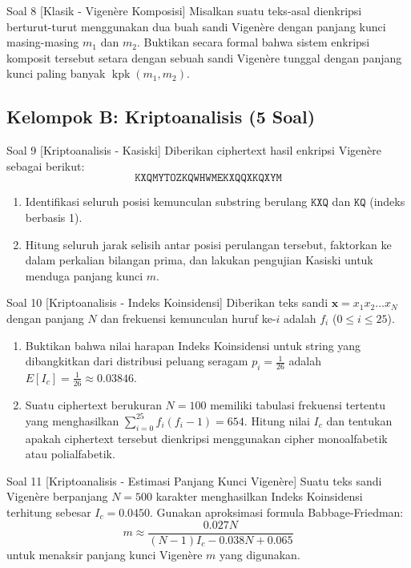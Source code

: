 \documentclass[11pt,a4paper]{article}
\begin{document}
\begin{soalklasik}{Soal 8 [Klasik - Vigenère Komposisi]}
Misalkan suatu teks-asal dienkripsi berturut-turut menggunakan dua buah sandi Vigenère dengan panjang kunci masing-masing $m_1$ dan $m_2$.
Buktikan secara formal bahwa sistem enkripsi komposit tersebut setara dengan sebuah sandi Vigenère tunggal dengan panjang kunci paling banyak $\operatorname{kpk}(m_1, m_2)$.
\end{soalklasik}

\newpage
\subsection{Kelompok B: Kriptoanalisis (5 Soal)}

\begin{soalanalisis}{Soal 9 [Kriptoanalisis - Kasiski]}
Diberikan ciphertext hasil enkripsi Vigenère sebagai berikut:
\[
\texttt{KXQMYTOZKQWHWMEKXQQXKQXYM}
\]
\begin{enumerate}[label=(\alph*)]
    \item Identifikasi seluruh posisi kemunculan substring berulang $\texttt{KXQ}$ dan $\texttt{KQ}$ (indeks berbasis 1).
    \item Hitung seluruh jarak selisih antar posisi perulangan tersebut, faktorkan ke dalam perkalian bilangan prima, dan lakukan pengujian Kasiski untuk menduga panjang kunci $m$.
\end{enumerate}
\end{soalanalisis}

\begin{soalanalisis}{Soal 10 [Kriptoanalisis - Indeks Koinsidensi]}
Diberikan teks sandi $\mathbf{x} = x_1 x_2 \dots x_N$ dengan panjang $N$ dan frekuensi kemunculan huruf ke-$i$ adalah $f_i$ ($0 \le i \le 25$).
\begin{enumerate}[label=(\alph*)]
    \item Buktikan bahwa nilai harapan Indeks Koinsidensi untuk string yang dibangkitkan dari distribusi peluang seragam $p_i = \frac{1}{26}$ adalah $E[I_c] = \frac{1}{26} \approx 0.03846$.
    \item Suatu ciphertext berukuran $N = 100$ memiliki tabulasi frekuensi tertentu yang menghasilkan $\sum_{i=0}^{25} f_i(f_i - 1) = 654$. Hitung nilai $I_c$ dan tentukan apakah ciphertext tersebut dienkripsi menggunakan cipher monoalfabetik atau polialfabetik.
\end{enumerate}
\end{soalanalisis}

\begin{soalanalisis}{Soal 11 [Kriptoanalisis - Estimasi Panjang Kunci Vigenère]}
Suatu teks sandi Vigenère berpanjang $N = 500$ karakter menghasilkan Indeks Koinsidensi terhitung sebesar $I_c = 0.0450$.
Gunakan aproksimasi formula Babbage-Friedman:
\[
m \approx \frac{0.027 N}{(N - 1)I_c - 0.038 N + 0.065}
\]
untuk menaksir panjang kunci Vigenère $m$ yang digunakan.
\end{soalanalisis}
\end{document}

